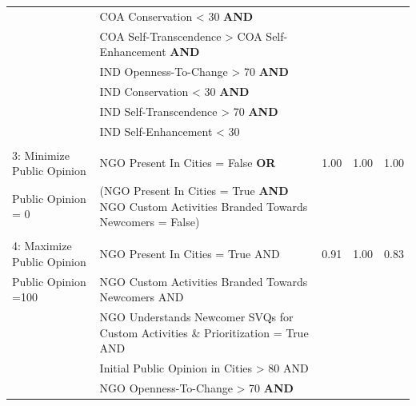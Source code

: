\documentclass{scspaperproc}
\theoremstyle{scsthe}
\begin{document}
\begin{table}[ht]
\begin{center}
{\begin{tabular}{|l l l l l |}
                                                                      & COA Conservation < 30 \textbf{AND} & & & \\ 
                                                                      & COA Self-Transcendence > COA Self-Enhancement \textbf{AND} & & & \\ 
                                                                      & IND Openness-To-Change > 70 \textbf{AND} & & & \\         
                                                                      & IND Conservation < 30 \textbf{AND} & & & \\ 
                                                                      & IND Self-Transcendence > 70 \textbf{AND} & & & \\ 
                                                                      & IND Self-Enhancement < 30 & & & \\ 
 & & & & \\                                                                                                                                                                                             
 \hline
3: Minimize Public Opinion                                                                                       &     NGO Present In Cities  = False  \textbf{OR}   & 1.00 & 1.00 & 1.00   \\
\hspace*{0.25 cm} Public Opinion = 0 & (NGO Present In Cities  = True \textbf{AND} NGO Custom Activities Branded Towards Newcomers = False) & & & \\
 & & & & \\  
\hline
4: Maximize Public Opinion                                                                                       &     NGO Present In Cities  = True  AND   & 0.91 & 1.00 & 0.83   \\
\hspace*{0.25cm} Public Opinion =100 & NGO Custom Activities Branded Towards Newcomers AND & & & \\
                                                                      & NGO Understands Newcomer SVQs for Custom Activities \& Prioritization = True AND & &  & \\
                                                                      & Initial Public Opinion in Cities > 80 AND & & & \\  
                                                                      & NGO Openness-To-Change > 70 \textbf{AND} & & & \\         

\end{tabular}}
\end{center}
\end{table}
\end{document}
